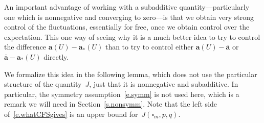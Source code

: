 \documentclass[11pt]{article} %
\let\oldsquare\square %
\renewcommand{\square}{\oldsquare}
\numberwithin{equation}{section}
\theoremstyle{definition}
\renewcommand{\a}{\mathbf{a}}
\newcommand{\ahom}{\bar{\a}}
\newcommand{\cu}{\square}
\begin{document}
An important advantage of working with a subadditive quantity---particularly one which is nonnegative and converging to zero---is that we obtain very strong control of the fluctuations, essentially for free, once we obtain control over the expectation. This one way of seeing why it is a much better idea to try to control the difference $\a(U) - \a_*(U)$ than to try to control either $\a(U) - \ahom$ or $\ahom - \a_*(U)$ directly.

\smallskip

We formalize this idea in the following lemma, which does not use the particular structure of the quantity~$J$, just that it is nonnegative and subadditive. In particular, the symmetry assumption~\eqref{e.symm} is not used here, which is a remark we will need in Section~\ref{s.nonsymm}. 
Note that the left side of~\eqref{e.whatCFSgives} is an upper bound for~$J(\cu_m,p,q)$.  
\end{document}
